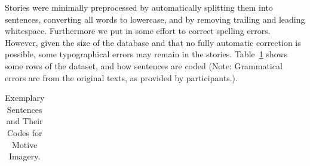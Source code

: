 \documentclass[man,a4paper,mask]{apa6}\usepackage[]{graphicx}\usepackage[]{color}
\begin{document}
Stories were minimally preprocessed by automatically splitting them into sentences, converting all words to lowercase, and by removing trailing and leading whitespace. Furthermore we put in some effort to correct spelling errors. However, given the size of the database and that no fully automatic correction is possible, some typographical errors may remain in the stories. Table~\ref{tab:dathead} shows some rows of the dataset, and how sentences are coded (Note: Grammatical errors are from the original texts, as provided by participants.).


\begin{table}
		\caption{Exemplary Sentences and Their Codes for Motive Imagery.}
		\label{tab:dathead}
		\footnotesize
		\begin{tabularx}{\textwidth}{XXrrrl}
		\toprule
		

\end{tabularx}
\end{table}
\end{document}
